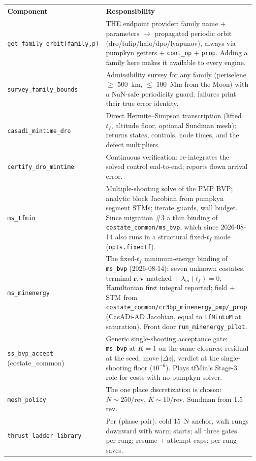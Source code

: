 \documentclass[11pt]{article}
\begin{document}
\begin{longtable}{p{}p{}}
\toprule
\textbf{Component} & \textbf{Responsibility}\\
\midrule
\texttt{get\_family\_orbit(family,p)} &
THE endpoint provider: family name $+$ parameters $\to$ propagated periodic
orbit (dro/tulip/halo/dpo/lyapunov), always via pumpkyn getters
$+$ \texttt{cont\_np} $+$ \texttt{prop}. Adding a family here makes it
available to every engine.\\
\texttt{survey\_family\_bounds} &
Admissibility survey for any family (periselene $\geq$ 500~km, $\leq$
100~Mm from the Moon) with a NaN-safe periodicity guard; failures print
their true error identity.\\
\texttt{casadi\_mintime\_dro} &
Direct Hermite--Simpson transcription (lifted $t_f$, altitude floor,
optional Sundman mesh); returns states, controls, node times, and the
defect multipliers.\\
\texttt{certify\_dro\_mintime} &
Continuous verification: re-integrates the solved control end-to-end;
reports flown arrival error.\\
\texttt{ms\_tfmin} &
Multiple-shooting solve of the PMP BVP; analytic block Jacobian from
pumpkyn segment STMs; iterate guards, wall budget. Since migration \#3 a
thin binding of \texttt{costate\_common/ms\_bvp}, which since 2026-08-14
also runs in a structural fixed-$t_f$ mode (\texttt{opts.fixedTf}).\\
\texttt{ms\_minenergy} &
The fixed-$t_f$ minimum-energy binding of \texttt{ms\_bvp} (2026-08-14):
seven unknown costates, terminal $\bm r,\bm v$ matched $+\ \lambda_m(t_f)=0$,
Hamiltonian first integral reported; field + STM from
\texttt{costate\_common/cr3bp\_minenergy\_pmp/\_prop} (CasADi-AD
Jacobian, equal to \texttt{tfMinEoM} at saturation). Front door
\texttt{run\_minenergy\_pilot}.\\
\texttt{ss\_bvp\_accept} (costate\_common) &
Generic single-shooting acceptance gate: \texttt{ms\_bvp} at $K=1$ on the
same closures; residual at the seed, move $|\Delta z|$, verdict at the
single-shooting floor ($10^{-6}$). Plays tfMin's Stage-3 role for costs
with no pumpkyn solver.\\
\texttt{mesh\_policy} &
The one place discretization is chosen: $N \sim 250/$rev,
$K \sim 10/$rev, Sundman from 1.5 rev.\\
\texttt{thrust\_ladder\_library} &
Per (phase pair): cold 15~N anchor, walk rungs downward with warm starts;
all three gates per rung; resume $+$ attempt caps; per-rung saves.\\

\end{longtable}
\end{document}

